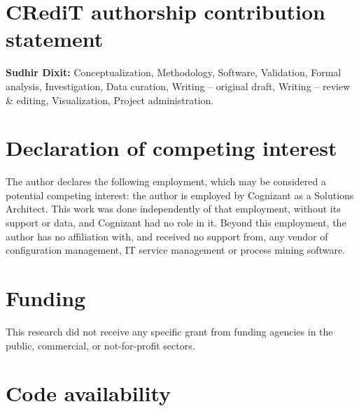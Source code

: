 
\section*{CRediT authorship contribution statement}

\textbf{Sudhir Dixit:} Conceptualization, Methodology, Software, Validation,
Formal analysis, Investigation, Data curation, Writing -- original draft,
Writing -- review \& editing, Visualization, Project administration.

\section*{Declaration of competing interest}

The author declares the following employment, which may be considered a
potential competing interest: the author is employed by Cognizant as a
Solutions Architect. This work was done independently of that employment,
without its support or data, and Cognizant had no role in it. Beyond this
employment, the author has no affiliation with, and received no support
from, any vendor of configuration management, IT service management or
process mining software.

\section*{Funding}

This research did not receive any specific grant from funding agencies in
the public, commercial, or not-for-profit sectors.

\section*{Code availability}

